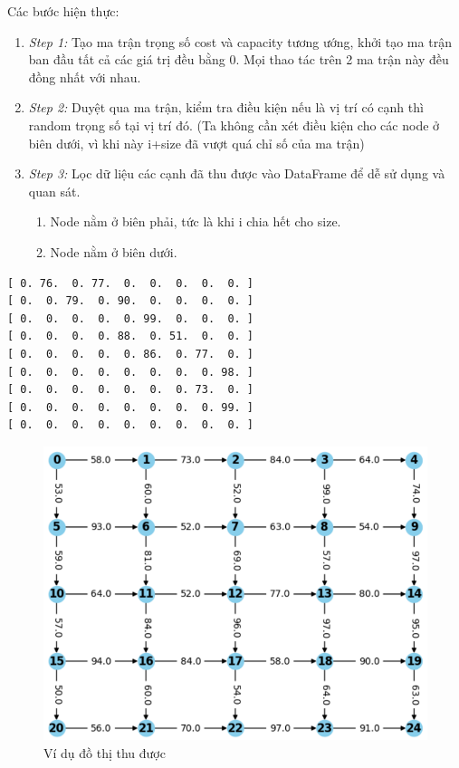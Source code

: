 \documentclass[a4paper]{article}
\begin{document}
{Các bước hiện thực: }
\begin{enumerate}
    \item[] {\textit{Step 1:} Tạo ma trận trọng số cost và capacity tương ướng, khởi tạo ma trận ban đầu tất cả các giá trị đều bằng 0. Mọi thao tác trên 2 ma trận này đều đồng nhất với nhau.}
    \item[] {\textit{Step 2:} Duyệt qua ma trận, kiểm tra điều kiện nếu là vị trí có cạnh thì random trọng số tại vị trí đó. (Ta không cần xét điều kiện cho các node ở biên dưới, vì khi này i+size đã vượt quá chỉ số của ma trận)}
    \item[] {\textit{Step 3:} Lọc dữ liệu các cạnh đã thu được vào DataFrame để dễ sử dụng và quan sát. } 
\begin{enumerate}
    \item[\bullet] {Node nằm ở biên phải, tức là khi i chia hết cho size. }
    \item[\bullet] {Node nằm ở biên dưới.}  
\end{enumerate}
\end{enumerate}
\begin{tcolorbox}[colback=blue!5!white,colframe=blue!75!black, title= \text{Ví dụ minh họa cho ma trận trọng số của đồ thị có $size = 3 \times ơ3$} ]
\begin{verbatim}
[ 0. 76.  0. 77.  0.  0.  0.  0.  0. ]
[ 0.  0. 79.  0. 90.  0.  0.  0.  0. ]
[ 0.  0.  0.  0.  0. 99.  0.  0.  0. ]
[ 0.  0.  0.  0. 88.  0. 51.  0.  0. ]
[ 0.  0.  0.  0.  0. 86.  0. 77.  0. ]
[ 0.  0.  0.  0.  0.  0.  0.  0. 98. ]
[ 0.  0.  0.  0.  0.  0.  0. 73.  0. ]
[ 0.  0.  0.  0.  0.  0.  0.  0. 99. ]
[ 0.  0.  0.  0.  0.  0.  0.  0.  0. ]
\end{verbatim}
\end{tcolorbox}
\begin{figure}[h]
    \centering
    \includegraphics[scale=0.9]{grid1.png}
    \caption{Ví dụ đồ thị thu được }
    \label{fig:enter-label}
\end{figure}
\end{document}

